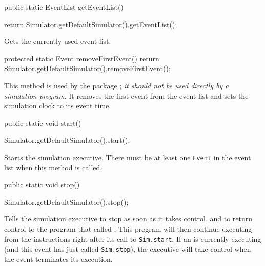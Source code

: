 \begin{htmlonly}
\end{htmlonly}
\begin{code}

   public static EventList getEventList()\begin{hide} {
      return Simulator.getDefaultSimulator().getEventList();
   }\end{hide}
\end{code}
\begin{tabb}  Gets the currently used event list.
\end{tabb}
\begin{htmlonly}
\end{htmlonly}
\begin{hide}
\begin{code}
   protected static Event removeFirstEvent() {
       return Simulator.getDefaultSimulator().removeFirstEvent();
   }
\end{code}
\begin{tabb}  This method is used by the package
  ;
  \emph{it should not be used directly by a simulation program}.
  It removes the first event from the event list and sets the simulation
  clock to its event time.
\end{tabb}
\begin{htmlonly}
\end{htmlonly}
\end{hide}
\begin{code}

   public static void start() \begin{hide} {
      Simulator.getDefaultSimulator().start();
   }\end{hide}
\end{code}
  \begin{tabb}  Starts the simulation executive.
   There must be at least one \texttt{Event} in the
   event list when this method is called.
  \end{tabb}
\begin{code}

   public static void stop() \begin{hide} {
      Simulator.getDefaultSimulator().stop();
   }\end{hide}
\end{code}
  \begin{tabb} Tells the simulation executive to stop as soon as it takes control,
   and to return control to the program that called .
   This program will then continue
   executing from the instructions right after its call to \texttt{Sim.start}.
   If an  is currently executing (and this event has just called
   \texttt{Sim.stop}), the executive will take
   control when the event terminates its execution.
  \end{tabb}
